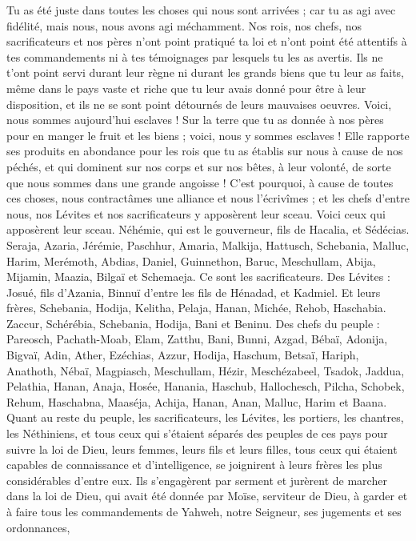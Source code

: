 \begin{multicols}{2}
Tu as été juste dans toutes les choses qui nous sont arrivées ; car tu as agi avec fidélité, mais nous, nous avons agi méchamment.
Nos rois, nos chefs, nos sacrificateurs et nos pères n'ont point pratiqué ta loi et n'ont point été attentifs à tes commandements ni à tes témoignages par lesquels tu les as avertis.
Ils ne t'ont point servi durant leur règne ni durant les grands biens que tu leur as faits, même dans le pays vaste et riche que tu leur avais donné pour être à leur disposition, et ils ne se sont point détournés de leurs mauvaises oeuvres.
Voici, nous sommes aujourd'hui esclaves ! Sur la terre que tu as donnée à nos pères pour en manger le fruit et les biens ; voici, nous y sommes esclaves !
Elle rapporte ses produits en abondance pour les rois que tu as établis sur nous à cause de nos péchés, et qui dominent sur nos corps et sur nos bêtes, à leur volonté, de sorte que nous sommes dans une grande angoisse !
C'est pourquoi, à cause de toutes ces choses, nous contractâmes une alliance et nous l'écrivîmes ; et les chefs d'entre nous, nos Lévites et nos sacrificateurs y apposèrent leur sceau.
\VerseOne{}Voici ceux qui apposèrent leur sceau. Néhémie, qui est le gouverneur, fils de Hacalia, et Sédécias.
Seraja, Azaria, Jérémie,
Paschhur, Amaria, Malkija,
Hattusch, Schebania, Malluc,
Harim, Merémoth, Abdias,
Daniel, Guinnethon, Baruc,
Meschullam, Abija, Mijamin,
Maazia, Bilgaï et Schemaeja. Ce sont les sacrificateurs.
Des Lévites : Josué, fils d'Azania, Binnuï d'entre les fils de Hénadad, et Kadmiel.
Et leurs frères, Schebania, Hodija, Kelitha, Pelaja, Hanan,
Michée, Rehob, Haschabia.
Zaccur, Schérébia, Schebania,
Hodija, Bani et Beninu.
Des chefs du peuple : Pareosch, Pachath-Moab, Elam, Zatthu, Bani,
Bunni, Azgad, Bébaï,
Adonija, Bigvaï, Adin,
Ather, Ezéchias, Azzur,
Hodija, Haschum, Betsaï,
Hariph, Anathoth, Nébaï,
Magpiasch, Meschullam, Hézir,
Meschézabeel, Tsadok, Jaddua,
Pelathia, Hanan, Anaja,
Hosée, Hanania, Haschub,
Hallochesch, Pilcha, Schobek,
Rehum, Haschabna, Maaséja,
Achija, Hanan, Anan,
Malluc, Harim et Baana.
Quant au reste du peuple, les sacrificateurs, les Lévites, les portiers, les chantres, les Néthiniens, et tous ceux qui s'étaient séparés des peuples de ces pays pour suivre la loi de Dieu, leurs femmes, leurs fils et leurs filles, tous ceux qui étaient capables de connaissance et d'intelligence,
se joignirent à leurs frères les plus considérables d'entre eux. Ils s'engagèrent par serment et jurèrent de marcher dans la loi de Dieu, qui avait été donnée par Moïse, serviteur de Dieu, à garder et à faire tous les commandements de Yahweh, notre Seigneur, ses jugements et ses ordonnances,

\end{multicols}
